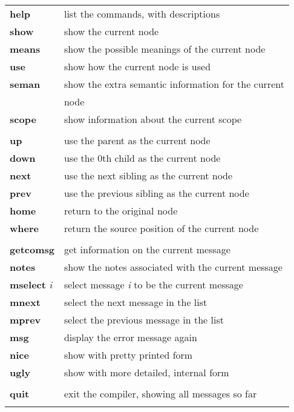 \begin{tabular}{ll}
\\{\bf help} &    
list the commands, with descriptions
\\{\bf show} &
show the current node
\\{\bf means} &
show the possible meanings of the current node
\\{\bf use} &
show how the current node is used
\\{\bf seman} &
show the extra semantic information for the current \\ & node
\\{\bf scope} &
show information about the current scope
\\
\\{\bf up} &
use the parent as the current node
\\{\bf down} &
use the $0$th child as the current node
\\{\bf next} &
use the next sibling as the current node
\\{\bf prev} &
use the previous sibling as the current node
\\{\bf home} &
return to the original node
\\{\bf where} &
return the source position of the current node 
\\
\\{\bf getcomsg} &
get information on the current message
\\{\bf notes} &   
show the notes associated with the current message
\\{\bf mselect} {\em i} &
select message {\em i} to be the current message
\\{\bf mnext} &   
select the next message in the list
\\{\bf mprev} &   
select the previous message in the list
\\{\bf msg} &     
display the error message again
\\{\bf nice} &    
show with pretty printed form
\\{\bf ugly} &    
show with more detailed, internal form
\\
\\{\bf quit} &
exit the compiler, showing all messages so far
\\ & \\
\end{tabular}


